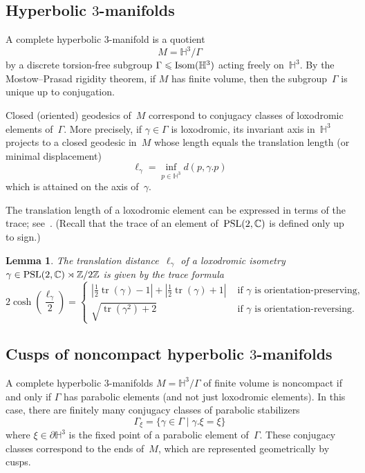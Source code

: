 \documentclass[11pt,reqno]{amsart}
\newtheorem{lemma}[theorem]{Lemma}
\theoremstyle{definition}
\numberwithin{equation}{section}
\newcommand\Z {{\mathbb Z}}
\newcommand\C {{\mathbb C}}
\newcommand{\HH}{{\mathbb H}}
\DeclareMathOperator{\tr}{tr}
\DeclareMathOperator{\Isom}{{\rm Isom}}
\newcommand{\PSL}{{\rm PSL}}
\numberwithin{equation}{section}
\begin{document}
\subsection{Hyperbolic \texorpdfstring{$3$}{3}-manifolds}
A complete hyperbolic $3$-manifold is a quotient 
\[
M=\HH^3 / \Gamma
\]
by a discrete torsion-free subgroup $\Gamma \leqslant  \Isom(\HH^3)$ acting freely on~$\HH^3$.
By the Mostow--Prasad rigidity theorem, if $M$ has finite volume, then the subgroup~$\Gamma$ is unique up to conjugation.

\medskip

Closed (oriented) geodesics of~$M$ correspond to conjugacy classes of loxodromic elements of~$\Gamma$.
More precisely, if $\gamma \in \Gamma$ is loxodromic, its invariant axis in~$\HH^3$ projects to a closed geodesic in~$M$ whose length equals the translation length (or minimal displacement)
\[
\ell_\gamma = \inf_{p \in \HH^3} d(p,\gamma.p)
\]
which is attained on the axis of~$\gamma$.

\medskip

The translation length of a loxodromic element can be expressed in terms of the trace; see~\cite[Lemma~5.1]{gen}.
(Recall that the trace of an element of~$\PSL(2,\C)$ is defined only up to sign.)

\begin{lemma}
The translation distance~$\ell_\gamma$ of a loxodromic isometry~$\gamma \in \PSL(2,\C) \rtimes \Z/2\Z$ is given by the trace formula
\begin{equation} \label{eq:trace}
2 \cosh\left(\frac{\ell_\gamma}{2} \right) = 
\begin{cases}
\left| \frac{1}{2} \tr(\gamma) -1 \right| + \left| \frac{1}{2} \tr(\gamma) +1 \right| & \text{ if } \gamma \text{ is orientation-preserving,} \\
\sqrt{\tr(\gamma^2) + 2} & \text{ if } \gamma \text{ is orientation-reversing.}
\end{cases}
\end{equation}
\end{lemma}


\subsection{Cusps of noncompact hyperbolic \texorpdfstring{$3$}{3}-manifolds}
A complete hyperbolic $3$-manifolds $M=\HH^3/\Gamma$ of finite volume is noncompact if and only if $\Gamma$ has parabolic elements (and not just loxodromic elements).
In this case, there are finitely many conjugacy classes of parabolic stabilizers
\[
\Gamma_\xi = \{ \gamma \in \Gamma \mid \gamma.\xi=\xi \}
\]
where $\xi \in \partial \HH^3$ is the fixed point of a parabolic element of~$\Gamma$.
These conjugacy classes correspond to the ends of~$M$, which are represented geometrically by cusps.
\end{document}
